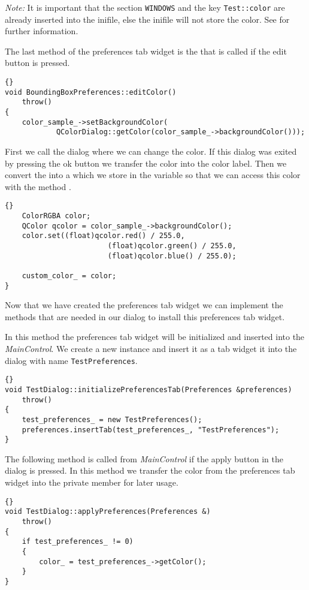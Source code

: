 {\em Note:} It is important that the section {\tt WINDOWS} and the key {\tt Test::color} are
already inserted into the inifile, else the inifile will not store the color.
See  for further information.

The last method of the preferences tab widget is the  that
is called if the edit button is pressed.
\begin{lstlisting}{}
void BoundingBoxPreferences::editColor()
	throw()
{
	color_sample_->setBackgroundColor(
			QColorDialog::getColor(color_sample_->backgroundColor()));
\end{lstlisting}
First we call the dialog  where we can change the color.
If this dialog was exited by pressing the ok button we transfer the color into
the color label.  Then we convert the  into a 
which we store in the variable  so that we can
access this color with the method .
\begin{lstlisting}{}
	ColorRGBA color;
	QColor qcolor = color_sample_->backgroundColor();
	color.set((float)qcolor.red() / 255.0,
						(float)qcolor.green() / 255.0,
						(float)qcolor.blue() / 255.0);
	
	custom_color_ = color;
}
\end{lstlisting}


Now that we have created the preferences tab widget we can implement the
methods that are needed in our dialog to install this preferences tab widget.

In this method the preferences tab widget will be initialized and inserted
into the {\em MainControl}.
We create a new  instance and insert it as a tab widget
it into the  dialog with name {\tt TestPreferences}.
\begin{lstlisting}{}
void TestDialog::initializePreferencesTab(Preferences &preferences)
	throw()
{
	test_preferences_ = new TestPreferences();
	preferences.insertTab(test_preferences_, "TestPreferences");
}
\end{lstlisting}

The following method is called from {\em MainControl} if the apply button in
the  dialog is pressed.  In this method we transfer the
color from the preferences tab widget into the private member 
for later usage.
\begin{lstlisting}{}
void TestDialog::applyPreferences(Preferences &)
	throw()
{
	if test_preferences_ != 0)
	{
		color_ = test_preferences_->getColor();
	}
}
\end{lstlisting}

